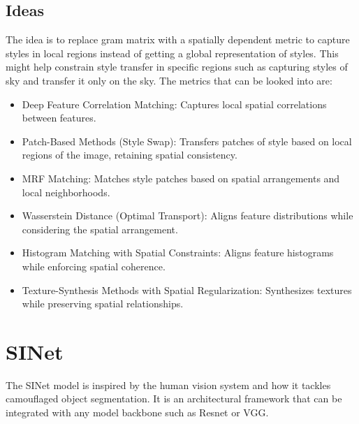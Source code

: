 \documentclass{article}
\begin{document}
\subsection{Ideas}
The idea is to replace gram matrix with a spatially dependent  metric to capture styles in local regions
instead of getting a global representation of styles. This might help constrain style transfer in specific regions
such as capturing styles of sky and transfer it only on the sky. The metrics that can be looked into are:\\
\begin{itemize}
	\item Deep Feature Correlation Matching: Captures local spatial correlations between features.
	\item Patch-Based Methods (Style Swap): Transfers patches of style based on local regions of the image, retaining spatial consistency.
	\item MRF Matching: Matches style patches based on spatial arrangements and local neighborhoods.
	\item Wasserstein Distance (Optimal Transport): Aligns feature distributions while considering the spatial arrangement.
	\item Histogram Matching with Spatial Constraints: Aligns feature histograms while enforcing spatial coherence.
	\item Texture-Synthesis Methods with Spatial Regularization: Synthesizes textures while preserving spatial relationships.
\end{itemize}
\clearpage
\section{SINet}
The SINet model is inspired by the human vision system and how it tackles camouflaged object segmentation. It is an architectural
framework that can be integrated with any model backbone such as Resnet or VGG.
\end{document}

